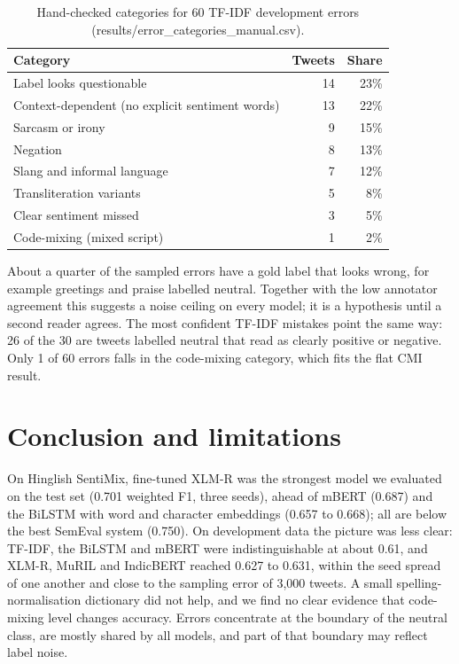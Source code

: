 \documentclass{nle}
\begin{document}
\begin{table}
\centering
\caption{Hand-checked categories for 60 TF-IDF development errors (results/error\_categories\_manual.csv).}
\label{tab:cats}
\begin{tabular}{lrr}
\hline\hline
Category & Tweets & Share \\
\hline
Label looks questionable & 14 & 23\% \\
Context-dependent (no explicit sentiment words) & 13 & 22\% \\
Sarcasm or irony & 9 & 15\% \\
Negation & 8 & 13\% \\
Slang and informal language & 7 & 12\% \\
Transliteration variants & 5 & 8\% \\
Clear sentiment missed & 3 & 5\% \\
Code-mixing (mixed script) & 1 & 2\% \\
\hline\hline
\end{tabular}
\end{table}

About a quarter of the sampled errors have a gold label that looks wrong, for example greetings and praise labelled
neutral. Together with the low annotator agreement \cite{patwa2020} this suggests a noise ceiling on every model; it is a
hypothesis until a second reader agrees. The most confident TF-IDF mistakes point the same way: 26 of the 30 are tweets
labelled neutral that read as clearly positive or negative. Only 1 of 60 errors falls in the code-mixing category, which fits the flat CMI result.

\section{Conclusion and limitations}
\label{sec:notdone}
On Hinglish SentiMix, fine-tuned XLM-R was the strongest model we evaluated on the test set (0.701 weighted F1, three seeds), ahead of mBERT (0.687) and the BiLSTM with word and character embeddings (0.657 to 0.668); all are below the best SemEval system (0.750). On development data the picture was less clear: TF-IDF, the BiLSTM and mBERT were indistinguishable at about 0.61, and XLM-R, MuRIL and IndicBERT reached 0.627 to 0.631, within the seed spread of one another and close to the sampling error of 3{,}000 tweets. A small spelling-normalisation dictionary did not help, and we find no clear evidence that code-mixing level changes
accuracy. Errors concentrate at the boundary of the neutral class, are mostly shared by all models, and part of that boundary
may reflect label noise.
\end{document}
